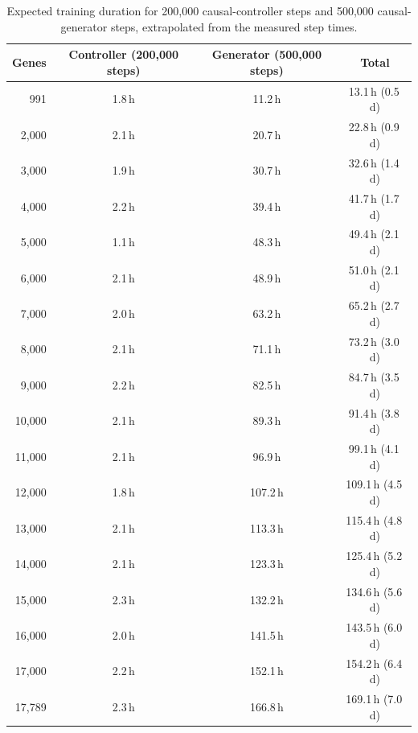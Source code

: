 \documentclass[11pt]{article}
\begin{document}
\begin{table}[H]
\centering
\small
\caption{Expected training duration for 200,000 causal-controller steps and 500,000 causal-generator steps, extrapolated from the measured step times.}
\label{tab:duration}
\begin{tabular}{rccc}
\toprule
Genes & Controller (200,000 steps) & Generator (500,000 steps) & Total \\
\midrule
991 & 1.8\,h & 11.2\,h & 13.1\,h (0.5\,d)\\
2,000 & 2.1\,h & 20.7\,h & 22.8\,h (0.9\,d)\\
3,000 & 1.9\,h & 30.7\,h & 32.6\,h (1.4\,d)\\
4,000 & 2.2\,h & 39.4\,h & 41.7\,h (1.7\,d)\\
5,000 & 1.1\,h & 48.3\,h & 49.4\,h (2.1\,d)\\
6,000 & 2.1\,h & 48.9\,h & 51.0\,h (2.1\,d)\\
7,000 & 2.0\,h & 63.2\,h & 65.2\,h (2.7\,d)\\
8,000 & 2.1\,h & 71.1\,h & 73.2\,h (3.0\,d)\\
9,000 & 2.2\,h & 82.5\,h & 84.7\,h (3.5\,d)\\
10,000 & 2.1\,h & 89.3\,h & 91.4\,h (3.8\,d)\\
11,000 & 2.1\,h & 96.9\,h & 99.1\,h (4.1\,d)\\
12,000 & 1.8\,h & 107.2\,h & 109.1\,h (4.5\,d)\\
13,000 & 2.1\,h & 113.3\,h & 115.4\,h (4.8\,d)\\
14,000 & 2.1\,h & 123.3\,h & 125.4\,h (5.2\,d)\\
15,000 & 2.3\,h & 132.2\,h & 134.6\,h (5.6\,d)\\
16,000 & 2.0\,h & 141.5\,h & 143.5\,h (6.0\,d)\\
17,000 & 2.2\,h & 152.1\,h & 154.2\,h (6.4\,d)\\
17,789 & 2.3\,h & 166.8\,h & 169.1\,h (7.0\,d)\\
\bottomrule
\end{tabular}
\end{table}
\end{document}
